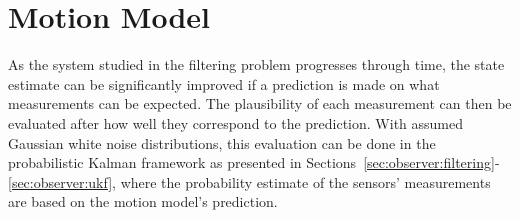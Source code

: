 \section{Motion Model}
\label{sec:observer:motionmodel}
    As the system studied in the filtering problem progresses through time,
    the state estimate can be significantly improved if a prediction
    is made on what measurements can be expected. The plausibility
    of each measurement can then be evaluated after how well they correspond to the prediction.
    With assumed Gaussian white noise distributions, this evaluation
    can be done in the probabilistic Kalman framework as presented in
    Sections~\ref{sec:observer:filtering}-\ref{sec:observer:ukf}, where the
    probability estimate of the sensors' measurements are based on the motion
    model's prediction.
\pagebreak
